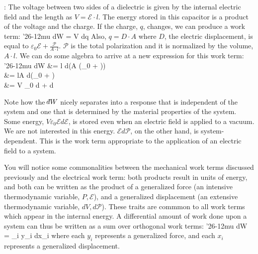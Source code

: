 \documentclass[12pt]{article}
\def\dbar{{\mathchar'26\mkern-12mu d}}
\begin{document}
: The voltage between two sides of a dielectric is given by the internal electric field and the length as $V = \mathcal{E} \cdot l$.  The energy stored in this capacitor is a product of the voltage and the charge.  If the charge, $q$, changes, we can produce a work term:
\eqs
\dbar W = V dq
\eqe
Also, $q=D \cdot A$ where $D$, the electric displacement, is equal to $\varepsilon_0 \mathcal{E} + \frac{\mathcal{P}}{A\cdot l}$.  $\mathcal{P}$ is the total polarization and it is normalized by the volume, $A\cdot l$. We can do some algebra to arrive at a new expression for this work term:
\eqs
\dbar W &=  l  \cdot d(A (\varepsilon_0  + ))\\
&= lA \cdot d(\varepsilon_0  + )\\
&= V \varepsilon_0  d +  d
\eqe

Note how the $\dbar W$ nicely separates into a response that is independent of the system and one that is determined by the material properties of the system. Some energy, $V \varepsilon_0 \mathcal{E} d\mathcal{E}$, is stored even when an electric field is applied to a vacuum. We are not interested in this energy. $\mathcal{E} d\mathcal{P}$, on the other hand, is system-dependent. This is the work term appropriate to the application of an electric field to a system. %

You will notice some commonalities between the mechanical work terms discussed previously and the electrical work term: both products result in units of energy, and both can be written as the product of a generalized force (an intensive thermodynamic variable, $P,\mathcal{E}$), and a generalized displacement (an extensive thermodynamic variable, $dV,d\mathcal{P}$). These traits are commmon to all work terms which appear in the internal energy. A differential amount of work done upon a system can thus be written as a sum over orthogonal work terms:
\eqs
\dbar W = \sum_i y_i dx_i
\eqe
where each $y_i$ represents a generalized force, and each $x_i$ represents a generalized displacement.
\end{document}
